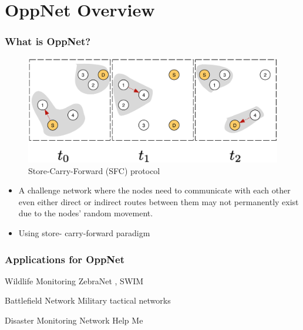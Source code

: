 \documentclass{beamer}
\begin{document}
\section{OppNet Overview}
\begin{frame}
	\frametitle{What is OppNet?}
	\begin{figure}
		\centering
		\includegraphics[width=0.7\linewidth]{Figures_Present/SFC}
		\caption{Store-Carry-Forward (SFC) protocol}
		\label{fig:SFC}
	\end{figure}
\begin{itemize}
	\item A challenge network where the nodes need to communicate with each other even either direct or indirect routes between them may not permanently exist due to the nodes’ random movement. 
	\item Using store- carry-forward paradigm \cite{Yamamura2011} 
\end{itemize}

\end{frame}
\begin{frame}[t]
	\frametitle{Applications for OppNet}
	
	\begin{block}{Wildlife Monitoring}
		ZebraNet \cite{zebranet2004}, SWIM \cite{Small2003}	
	\end{block}
	
	\begin{block}{Battlefield Network}
		Military tactical networks \cite{Kerdsri2012} \cite{Scott2005}
	\end{block}
	
	\begin{block}{Disaster Monitoring Network}
		Help Me \cite{Mokryn2012}
	\end{block}
	
\end{frame}

\end{document}

